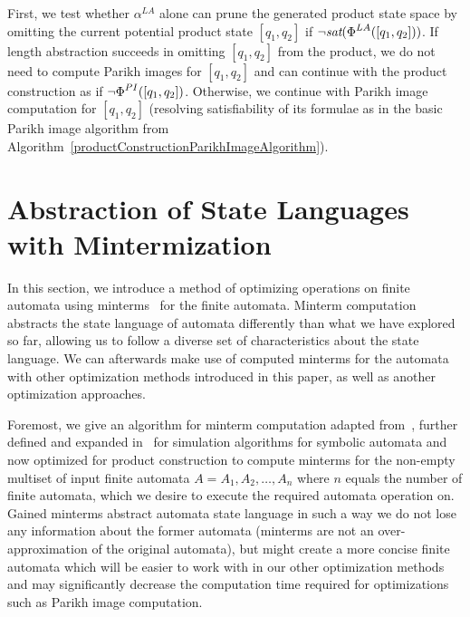 First, we test whether $\alpha^{LA}$ alone can prune the generated product state space by omitting the current potential product state $[q_1, q_2]$ if $\neg \emph{sat}(\emph{$\Phi$}^{LA}([q_1, q_2]))$. If length abstraction succeeds in omitting $[q_1, q_2]$ from the product, we do not need to compute Parikh images for $[q_1, q_2]$ and can continue with the product construction as if $\neg \emph{$\Phi$}^{PI}([q_1, q_2])$. Otherwise, we continue with Parikh image computation for $[q_1, q_2]$ (resolving satisfiability of its formulae as in the basic Parikh image algorithm from Algorithm~\ref{productConstructionParikhImageAlgorithm}).


\section{Abstraction of State Languages with Mintermization}

In this section, we introduce a method of optimizing operations on finite automata using minterms~\cite{minterms-10.1007/978-3-642-18275-4_18} for the finite automata. Minterm computation abstracts the state language of automata differently than what we have explored so far, allowing us to follow a diverse set of characteristics about the state language. We can afterwards make use of computed minterms for the automata with other optimization methods introduced in this paper, as well as another optimization approaches.

Foremost, we give an algorithm for minterm computation adapted from~\cite{minterm_computation-Dantoni2014MinimizationOS}, further defined and expanded in~\cite{minterms_forms-FITPUB11801} for simulation algorithms for symbolic automata and now optimized for product construction to compute minterms for the non-empty multiset of input finite automata $A = {A_1, A_2, \dots, A_n}$ where $n$ equals the number of finite automata, which we desire to execute the required automata operation on. Gained minterms abstract automata state language in such a way we do not lose any information about the former automata (minterms are not an over-approximation of the original automata), but might create a more concise finite automata which will be easier to work with in our other optimization methods and may significantly decrease the computation time required for optimizations such as Parikh image computation.

